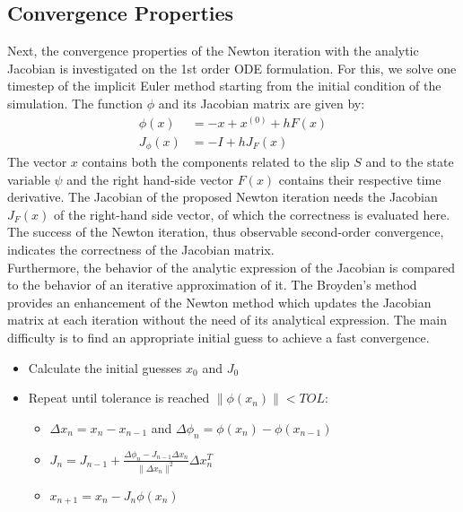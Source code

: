 \subsection{Convergence Properties}
Next, the convergence properties of the Newton iteration with the analytic Jacobian is investigated on the 1st order ODE formulation. For this, we solve one timestep of the implicit Euler method starting from the initial condition of the simulation. The function $\phi$ and its Jacobian matrix are given by: 
\begin{align}
\phi(x) &= -x + x^{(0)} + h F(x) \\
J_\phi(x) &= -I + h J_F(x)
\end{align}
The vector $x$ contains both the components related to the slip $S$ and to the state variable $\psi$ and the right hand-side vector $F(x)$ contains their respective time derivative. The Jacobian of the proposed Newton iteration needs the Jacobian $J_F(x)$ of the right-hand side vector, of which the correctness is evaluated here. The success of the Newton iteration, thus observable second-order convergence, indicates the correctness of the Jacobian matrix. \\
Furthermore, the behavior of the analytic expression of the Jacobian is compared to the behavior of an iterative approximation of it. The Broyden's method \cite{BroydenIteration} provides an enhancement of the Newton method which updates the Jacobian matrix at each iteration without the need of its analytical expression. The main difficulty is to find an appropriate initial guess to achieve a fast convergence. 

\begin{itemize}
	\item Calculate the initial guesses $x_0$ and $J_0$
	\item Repeat until tolerance is reached $\|\phi(x_n)\| < TOL$: 
	\begin{itemize}
		\item $\Delta x_n = x_n - x_{n-1}$ and $\Delta \phi_n = \phi(x_n) - \phi(x_{n-1})$ 
		\item $J_n = J_{n-1} + \frac{\Delta \phi_n - J_{n-1}\Delta x_n}{\|\Delta x_n\|^2} \Delta x_n^T$
		\item $x_{n+1} = x_n - J_n \phi(x_n)$
	\end{itemize} 
\end{itemize}

